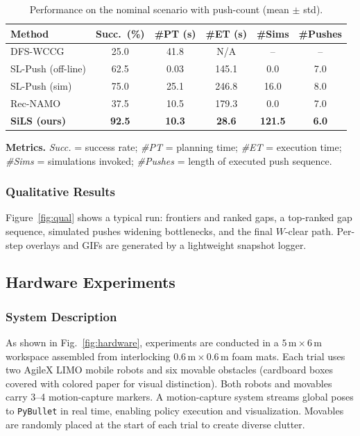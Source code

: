 \begin{table}[t]
  \centering
  \begin{threeparttable}
  \caption{Performance on the nominal scenario with push-count (mean $\pm$ std).}
  \label{tab:main}
  \vspace{2pt}
  \setlength{\tabcolsep}{2.3pt}
\begin{tabular}{lccccc}
\toprule
Method & Succ.~(\%) & \#PT (s) & \#ET (s) & \#Sims & \#Pushes \\
\midrule
DFS-WCCG            & 25.0  & 41.8  & N/A     & --    & --   \\
SL-Push (off-line)  & 62.5  & 0.03  & 145.1   & 0.0   & 7.0  \\
SL-Push (sim)       & 75.0  & 25.1  & 246.8   & 16.0  & 8.0  \\
Rec-NAMO            & 37.5  & 10.5  & 179.3   & 0.0   & 7.0  \\
\textbf{SiLS (ours)}& \textbf{92.5} & \textbf{10.3} & \textbf{28.6} & \textbf{121.5} & \textbf{6.0} \\
\bottomrule
\end{tabular}
  \begin{tablenotes}[flushleft]\footnotesize
  \item \textbf{Metrics.} \emph{Succ.} = success rate; \emph{\#PT} = planning time; \emph{\#ET} = execution time; \emph{\#Sims} = simulations invoked; \emph{\#Pushes} = length of executed push sequence.
  \end{tablenotes}
  \end{threeparttable}
\end{table}

\subsubsection{Qualitative Results}
\label{subsec:qual}
Figure~\ref{fig:qual} shows a typical run: frontiers and ranked gaps, a top-ranked gap sequence, simulated pushes widening bottlenecks, and the final $W$-clear path. Per-step overlays and GIFs are generated by a lightweight snapshot logger.

\subsection{Hardware Experiments}\label{subsec:hardware}

\subsubsection{System Description}\label{subsec:exp-description}
As shown in Fig.~\ref{fig:hardware},
experiments are conducted in a $5\,\mathrm{m}\times6\,\mathrm{m}$ workspace assembled from interlocking $0.6\,\mathrm{m}\times0.6\,\mathrm{m}$ foam mats.
Each trial uses two AgileX LIMO mobile robots and six movable obstacles (cardboard boxes covered with colored paper for visual distinction).
Both robots and movables carry 3--4 motion-capture markers.
A motion-capture system streams global poses to \texttt{PyBullet} in real time, enabling policy execution and visualization.
Movables are randomly placed at the start of each trial to create diverse clutter.

